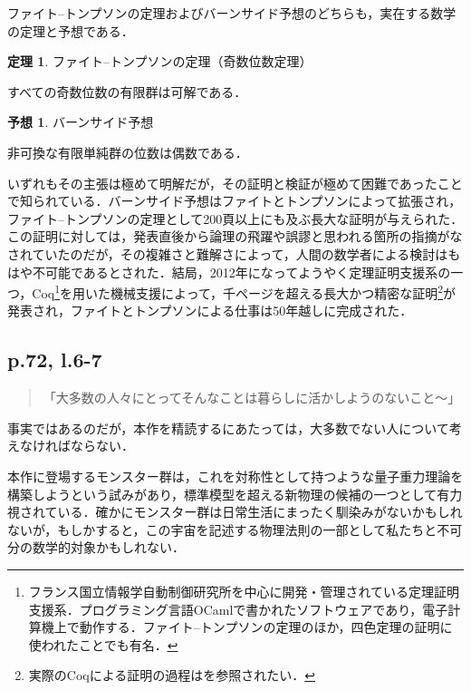 \documentclass[10pt, a5paper, twoside]{jsarticle}
\theoremstyle{definition}
\newtheorem{thm}{定理}
\newtheorem{hyp}{予想}
\begin{document}
			ファイト--トンプソンの定理およびバーンサイド予想のどちらも，実在する数学の定理と予想である．

			\begin{thm}
				
				ファイト--トンプソンの定理（奇数位数定理）

				すべての奇数位数の有限群は可解である．

			\end{thm}

			\begin{hyp}
				
				バーンサイド予想

				非可換な有限単純群の位数は偶数である．

			\end{hyp}

			いずれもその主張は極めて明解だが，その証明と検証が極めて困難であったことで知られている．バーンサイド予想はファイトとトンプソンによって拡張され，ファイト--トンプソンの定理として200頁以上にも及ぶ長大な証明\cite{ft}が与えられた．この証明に対しては，発表直後から論理の飛躍や誤謬と思われる箇所の指摘がなされていたのだが，その複雑さと難解さによって，人間の数学者による検討はもはや不可能であるとされた．結局，2012年になってようやく定理証明支援系の一つ，Coq\footnote{フランス国立情報学自動制御研究所を中心に開発・管理されている定理証明支援系．プログラミング言語OCamlで書かれたソフトウェアであり，電子計算機上で動作する．ファイト--トンプソンの定理のほか，四色定理の証明に使われたことでも有名．}を用いた機械支援によって，千ページを超える長大かつ精密な証明\footnote{実際のCoqによる証明の過程は\cite{oo}を参照されたい．}が発表され，ファイトとトンプソンによる仕事は50年越しに完成された．

		\subsection{p.72, l.6-7}

			\begin{quote}
				
				「大多数の人々にとってそんなことは暮らしに活かしようのないこと〜」

			\end{quote}

			事実ではあるのだが，本作を精読するにあたっては，大多数でない人について考えなければならない．

			本作に登場するモンスター群は，これを対称性として持つような量子重力理論を構築しようという試みがあり，標準模型を超える新物理の候補の一つとして有力視されている．確かにモンスター群は日常生活にまったく馴染みがないかもしれないが，もしかすると，この宇宙を記述する物理法則の一部として私たちと不可分の数学的対象かもしれない．
\end{document}
